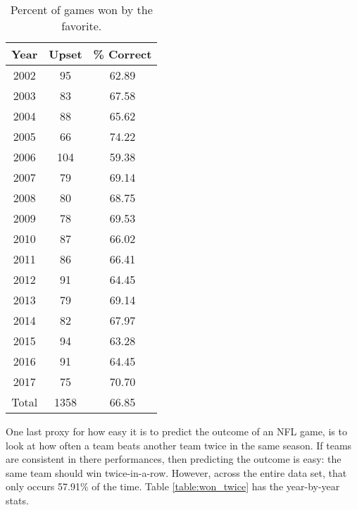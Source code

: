 \documentclass[11pt]{article}
\begin{document}
\begin{table}[!htb]
\begin{center}
\scriptsize
\begin{tabular}{|c|c|c|}
\hline
Year & Upset & \% Correct\\
\hline
2002 & 95 & 62.89\\
2003 & 83 & 67.58\\
2004 & 88 & 65.62\\
2005 & 66 & 74.22\\
2006 & 104 & 59.38\\
2007 & 79 & 69.14\\
2008 & 80 & 68.75\\
2009 & 78 & 69.53\\
2010 & 87 & 66.02\\
2011 & 86 & 66.41\\
2012 & 91 & 64.45\\
2013 & 79 & 69.14\\
2014 & 82 & 67.97\\
2015 & 94 & 63.28\\
2016 & 91 & 64.45\\
2017 & 75 & 70.70\\
\hline
Total & 1358 & 66.85\\
\hline
\end{tabular}
\caption{Percent of games won by the favorite.}\label{table:favorite_wins}
\end{center}
\end{table}

One last proxy for how easy it is to predict the outcome of an NFL game, is to look at how often a team beats another team twice in the same season. If teams are consistent in there performances, then predicting the outcome is easy: the same team should win twice-in-a-row. However, across the entire data set, that only occurs 57.91\% of the time. Table \ref{table:won_twice} has the year-by-year stats.
\end{document}

